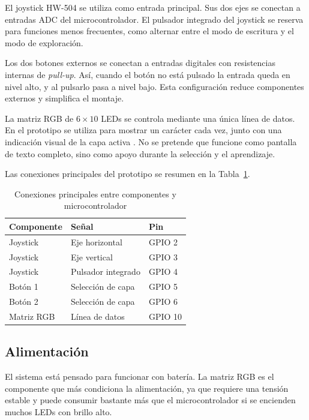 El joystick HW-504 se utiliza como entrada principal. Sus dos ejes se conectan a entradas ADC del microcontrolador. El pulsador integrado del joystick se reserva para funciones menos frecuentes, como alternar entre el modo de escritura y el modo de exploración.

Los dos botones externos se conectan a entradas digitales con resistencias internas de \textit{pull-up}. Así, cuando el botón no está pulsado la entrada queda en nivel alto, y al pulsarlo pasa a nivel bajo. Esta configuración reduce componentes externos y simplifica el montaje.

La matriz RGB de \(6 \times 10\) LEDs se controla mediante una única línea de datos. En el prototipo se utiliza para mostrar un carácter cada vez, junto con una indicación visual de la capa activa \cite{seeedRGBMatrix}. No se pretende que funcione como pantalla de texto completo, sino como apoyo durante la selección y el aprendizaje.

Las conexiones principales del prototipo se resumen en la Tabla~\ref{tab:conexiones-hardware-nuevo}.

\begin{table}[H]
    \centering
    \caption{Conexiones principales entre componentes y microcontrolador}
    \label{tab:conexiones-hardware-nuevo}
    \begin{tabularx}{\textwidth}{@{}p{}Xp{}@{}}
        \toprule
        \textbf{Componente} & \textbf{Señal} & \textbf{Pin} \\
        \midrule
        Joystick & Eje horizontal & GPIO 2 \\
        Joystick & Eje vertical & GPIO 3 \\
        Joystick & Pulsador integrado & GPIO 4 \\
        Botón 1 & Selección de capa & GPIO 5 \\
        Botón 2 & Selección de capa & GPIO 6 \\
        Matriz RGB & Línea de datos & GPIO 10 \\
        \bottomrule
    \end{tabularx}
\end{table}

\subsection{Alimentación}
\label{subsec:alimentacion-nuevo}

El sistema está pensado para funcionar con batería. La matriz RGB es el componente que más condiciona la alimentación, ya que requiere una tensión estable y puede consumir bastante más que el microcontrolador si se encienden muchos LEDs con brillo alto.

